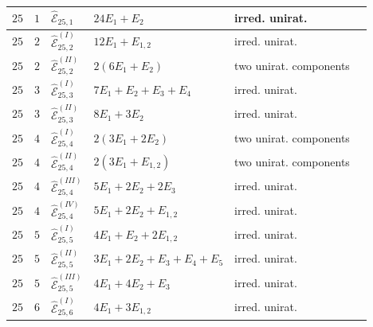 \documentclass[11pt]{amsart}
\theoremstyle{definition}
\def\E{{\mathcal E}}
\begin{document}
\begin{minipage}[t]{\textwidth/2-1mm}
{\begin{tabular}{ |l | l |l|l|l|l|}
$25$ & $1$ & $\widehat{\E}_{25,1}$ & $24E_1+E_2$ & irred. unirat. \\\hline
$25$ & $2$ & $\widehat{\E}_{25,2}^{(I)}$ & $12E_1+E_{1,2}$ & irred. unirat. \\
$25$ & $2$ & $\widehat{\E}_{25,2}^{(II)}$ & $2(6E_1+E_2)$ & two  unirat. components \\\hline
$25$ & $3$ & $\widehat{\E}_{25,3}^{(I)}$ & $7E_1+E_2+E_3+E_4$ & irred. unirat.\\
$25$ & $3$ & $\widehat{\E}_{25,3}^{(II)}$ & $8E_1+3E_2$  & irred. unirat.\\\hline 
$25$ & $4$ & $\widehat{\E}_{25,4}^{(I)}$ & $2(3E_1+2E_2)$ & two  unirat. components \\
$25$ & $4$ & $\widehat{\E}_{25,4}^{(II)}$ & $2(3E_1+E_{1,2})$ & two  unirat. components \\
$25$ & $4$ & $\widehat{\E}_{25,4}^{(III)}$ & $5E_1+2E_2+2E_3$ & irred. unirat.\\
$25$ & $4$ & $\widehat{\E}_{25,4}^{(IV)}$ & $5E_1+2E_2+E_{1,2}$  & irred. unirat.\\\hline 
$25$ & $5$ & $\widehat{\E}_{25,5}^{(I)}$ & $4E_1+E_2+2E_{1,2}$ & irred. unirat. \\
$25$ & $5$ & $\widehat{\E}_{25,5}^{(II)}$ & $3E_{1}+2E_2+E_3+E_4+E_5$  & irred. unirat. \\
$25$ & $5$ & $\widehat{\E}_{25,5}^{(III)}$ & $4E_{1}+4E_2+E_3$  & irred. unirat.
\\\hline 
$25$ & $6$ & $\widehat{\E}_{25,6}^{(I)}$ & $4E_1+3E_{1,2}$ & irred. unirat. \\\hline
\end{tabular}    
}
\end{minipage}
%
%
%
%
\hfill
\end{document}
